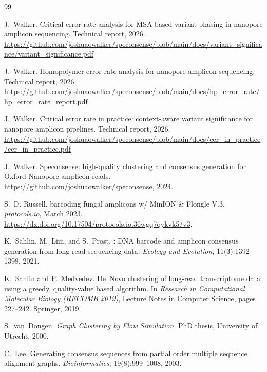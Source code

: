 \documentclass[11pt]{article}
\begin{document}

\begin{thebibliography}{99}

J.~Walker.
\newblock Critical error rate analysis for {MSA}-based variant phasing in
nanopore amplicon sequencing.
\newblock Technical report, 2026.
\newblock \url{https://github.com/joshuaowalker/speconsense/blob/main/docs/variant_significance/variant_significance.pdf}

J.~Walker.
\newblock Homopolymer error rate analysis for nanopore amplicon sequencing.
\newblock Technical report, 2026.
\newblock \url{https://github.com/joshuaowalker/speconsense/blob/main/docs/hp_error_rate/hp_error_rate_report.pdf}

J.~Walker.
\newblock Critical error rate in practice: context-aware variant significance
for nanopore amplicon pipelines.
\newblock Technical report, 2026.
\newblock \url{https://github.com/joshuaowalker/speconsense/blob/main/docs/cer_in_practice/cer_in_practice.pdf}

J.~Walker.
\newblock Speconsense: high-quality clustering and consensus generation for
{Oxford Nanopore} amplicon reads.
\newblock \url{https://github.com/joshuaowalker/speconsense}, 2024.

S.~D. Russell.
 barcoding fungal amplicons w/ {MinION \& Flongle V.3}.
\newblock \emph{protocols.io}, March 2023.
\newblock \url{https://dx.doi.org/10.17504/protocols.io.36wgq7qykvk5/v3}.

K.~Sahlin, M.~Lim, and S.~Prost.
: {DNA} barcode and amplicon consensus generation from
long-read sequencing data.
\newblock \emph{Ecology and Evolution}, 11(3):1392--1398, 2021.

K.~Sahlin and P.~Medvedev.
\newblock De~Novo clustering of long-read transcriptome data using a greedy,
quality-value based algorithm.
\newblock In \emph{Research in Computational Molecular Biology (RECOMB 2019)},
Lecture Notes in Computer Science, pages 227--242. Springer, 2019.

S.~van~Dongen.
\newblock \emph{Graph Clustering by Flow Simulation}.
\newblock PhD thesis, University of Utrecht, 2000.

C.~Lee.
\newblock Generating consensus sequences from partial order multiple sequence
alignment graphs.
\newblock \emph{Bioinformatics}, 19(8):999--1008, 2003.


\end{thebibliography}
\end{document}
